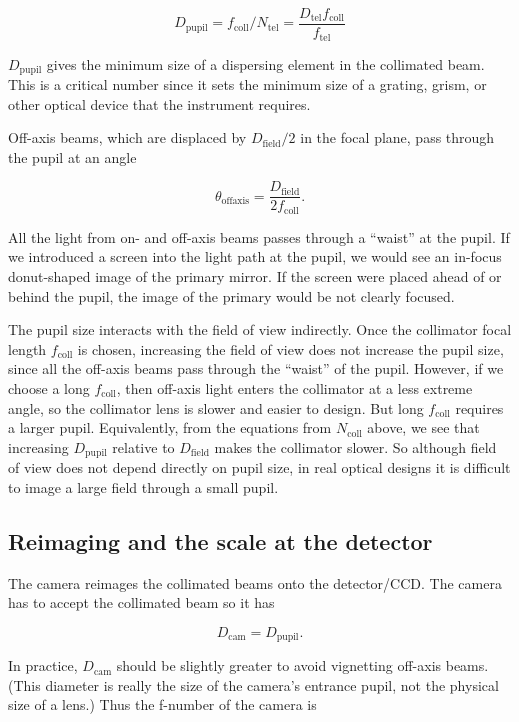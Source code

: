\documentclass[12pt]{article}
\begin{document}
$$ D_{\mathrm{pupil}} = f_{\mathrm{coll}} / N_{\mathrm{tel}} = \frac{D_{\mathrm{tel}} f_{\mathrm{coll}}}{f_{\mathrm{tel}}} $$

$D_{\mathrm{pupil}}$ gives the minimum size of a dispersing element in the
collimated beam.  This is a critical number since it sets the
minimum size of a grating, grism, or other optical device that the
instrument requires.

Off-axis beams, which are displaced by 
$D_{\mathrm{field}}/2$ in the focal plane, pass through the pupil at an angle

$$ \theta_{\mathrm{offaxis}} = \frac{D_{\mathrm{field}}}{2f_{\mathrm{coll}}}. $$

All the light from on- and off-axis beams passes 
through a ``waist'' at the pupil.  If we introduced a 
screen into the light path at the pupil, we would see an in-focus
donut-shaped image of the primary mirror.  If the screen
were placed ahead of or behind the pupil, the image of the primary
would be not clearly focused.  

The pupil size interacts with the field of view indirectly.
Once the collimator focal length $f_{\mathrm{coll}}$ is chosen, increasing the 
field of view does not increase the pupil size, since all
the off-axis beams pass through the ``waist'' of the pupil.
However, if we choose a
long $f_{\mathrm{coll}}$, then off-axis light enters the collimator at
a less extreme angle, so the collimator lens is slower and
easier to design.  But long $f_{\mathrm{coll}}$ requires a larger
pupil.  Equivalently, from the equations from $N_{\mathrm{coll}}$ above,
we see that increasing $D_{\mathrm{pupil}}$ relative to $D_{\mathrm{field}}$ makes
the collimator slower.  So although field of view does not
depend directly on pupil size, in real optical designs
it is difficult to
image a large field through a small pupil.

\subsection{Reimaging and the scale at the detector}

The camera reimages the collimated beams onto the detector/CCD.
The camera has to accept the collimated beam so it has

$$ D_{\mathrm{cam}} = D_{\mathrm{pupil}}. $$

In practice, $D_{\mathrm{cam}}$ should be slightly greater to avoid 
vignetting off-axis beams.  (This diameter is really the size of the
camera's entrance pupil, not the physical size of a lens.)  
Thus the f-number of the camera is 
\end{document}
